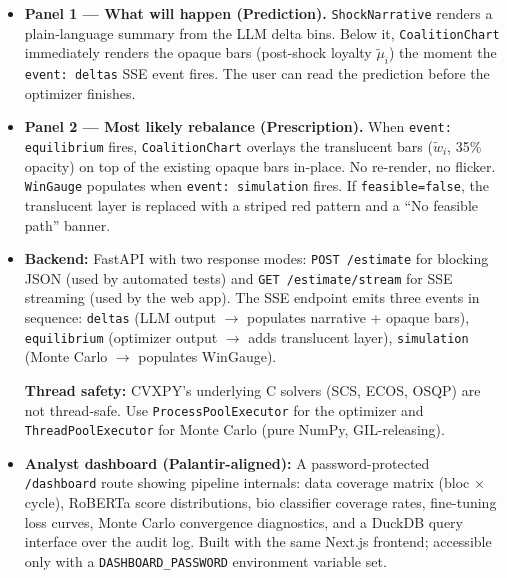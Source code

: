 \documentclass[11pt]{article}
\begin{document}
\begin{itemize}[leftmargin=1.6em, itemsep=3pt]
        The translucent layer is absent until the \texttt{event: equilibrium}
        SSE event fires. The opaque bars are fully readable while the optimizer
        runs --- the user sees the prediction immediately and the rebalance
        overlays a moment later.

  \item \textbf{Panel 1 --- What will happen (Prediction).}
        \texttt{ShockNarrative} renders a plain-language summary from the LLM
        delta bins. Below it, \texttt{CoalitionChart} immediately renders the
        opaque bars (post-shock loyalty $\tilde{\mu}_i$) the moment the
        \texttt{event: deltas} SSE event fires. The user can read the prediction
        before the optimizer finishes.

  \item \textbf{Panel 2 --- Most likely rebalance (Prescription).}
        When \texttt{event: equilibrium} fires, \texttt{CoalitionChart} overlays
        the translucent bars ($\tilde{w}_i$, 35\% opacity) on top of the
        existing opaque bars in-place. No re-render, no flicker.
        \texttt{WinGauge} populates when \texttt{event: simulation} fires.
        If \texttt{feasible=false}, the translucent layer is replaced with
        a striped red pattern and a ``No feasible path'' banner.

  \item \textbf{Backend:} FastAPI with two response modes:
        \texttt{POST /estimate} for blocking JSON (used by automated tests) and
        \texttt{GET /estimate/stream} for SSE streaming (used by the web app).
        The SSE endpoint emits three events in sequence:
        \texttt{deltas} (LLM output $\to$ populates narrative + opaque bars),
        \texttt{equilibrium} (optimizer output $\to$ adds translucent layer),
        \texttt{simulation} (Monte Carlo $\to$ populates WinGauge).

        \textbf{Thread safety:} CVXPY's underlying C solvers (SCS, ECOS, OSQP) are
        not thread-safe. Use \texttt{ProcessPoolExecutor} for the optimizer and
        \texttt{ThreadPoolExecutor} for Monte Carlo (pure NumPy, GIL-releasing).

  \item \textbf{Analyst dashboard (Palantir-aligned):} A password-protected
        \texttt{/dashboard} route showing pipeline internals: data coverage matrix
        (bloc $\times$ cycle), RoBERTa score distributions, bio classifier coverage
        rates, fine-tuning loss curves, Monte Carlo convergence diagnostics,
        and a DuckDB query interface over the audit log. Built with the same
        Next.js frontend; accessible only with a \texttt{DASHBOARD\_PASSWORD}
        environment variable set.


\end{itemize}
\end{document}
